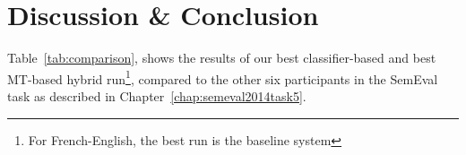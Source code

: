 

\section{Discussion \& Conclusion}
\label{discuss}


Table~\ref{tab:comparison}, shows the results of our best classifier-based and best MT-based hybrid run\footnote{For
French-English, the best run is the baseline system}, compared to the other six participants in the SemEval task as
described in Chapter~\ref{chap:semeval2014task5}.

